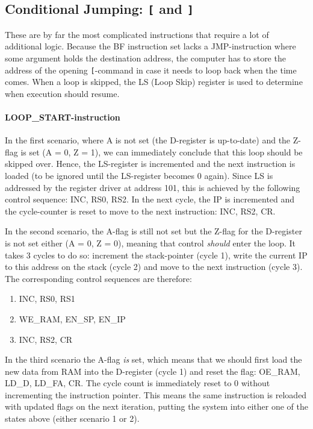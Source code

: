 \subsection{Conditional Jumping: \texttt{[} and \texttt{]}}
These are by far the most complicated instructions that require a lot of additional logic. Because the BF instruction set lacks a JMP-instruction where some argument holds the destination address, the computer has to store the address of the opening \texttt{[}-command in case it needs to loop back when the time comes. When a loop is skipped, the LS (Loop Skip) register is used to determine when execution should resume.

\paragraph{LOOP\_START-instruction} In the first scenario, where A is not set (the D-register is up-to-date) and the Z-flag is set (A = 0, Z = 1), we can immediately conclude that this loop should be skipped over. Hence, the LS-register is incremented and the next instruction is loaded (to be ignored until the LS-register becomes 0 again). Since LS is addressed by the register driver at address 101, this is achieved by the following control sequence: INC, RS0, RS2. In the next cycle, the IP is incremented and the cycle-counter is reset to move to the next instruction: INC, RS2, CR.

  In the second scenario, the A-flag is still not set but the Z-flag for the D-register is not set either (A = 0, Z = 0), meaning that control \emph{should} enter the loop. It takes 3 cycles to do so: increment the stack-pointer (cycle 1), write the current IP to this address on the stack (cycle 2) and move to the next instruction (cycle 3). The corresponding control sequences are therefore:
  \begin{enumerate}
  \item INC, RS0, RS1
  \item WE\_RAM, EN\_SP, EN\_IP
  \item INC, RS2, CR
  \end{enumerate}

In the third scenario the A-flag \emph{is} set, which means that we should first load the new data from RAM into the D-register (cycle 1) and reset the flag: OE\_RAM, LD\_D, LD\_FA, CR. The cycle count is immediately reset to 0 without incrementing the instruction pointer. This means the same instruction is reloaded with updated flags on the next iteration, putting the system into either one of the states above (either scenario 1 or 2).


